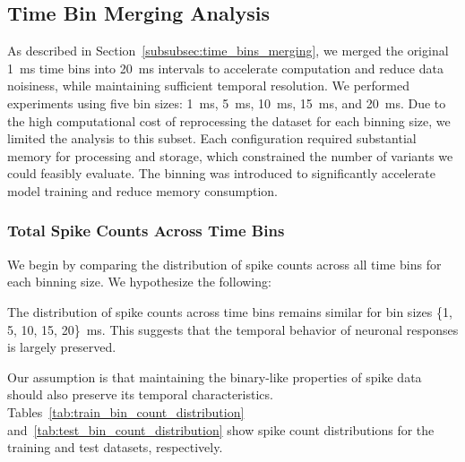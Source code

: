 \subsection{Time Bin Merging Analysis}
\label{subsec:time_bin_merging_analysis}
As described in Section~\ref{subsubsec:time_bins_merging}, we merged the original 1~ms time bins into 20~ms intervals to accelerate computation and reduce data noisiness, while maintaining sufficient temporal resolution. We performed experiments using five bin sizes: 1~ms, 5~ms, 10~ms, 15~ms, and 20~ms. Due to the high computational cost of reprocessing the dataset for each binning size, we limited the analysis to this subset. Each configuration required substantial memory for processing and storage, which constrained the number of variants we could feasibly evaluate. The binning was introduced to significantly accelerate model training and reduce memory consumption.

\subsubsection{Total Spike Counts Across Time Bins}
\label{subsubsec:spike_counts_time_bins}

We begin by comparing the distribution of spike counts across all time bins for each binning size. We hypothesize the following:

\begin{claim}
    The distribution of spike counts across time bins remains similar for bin sizes \{1, 5, 10, 15, 20\}~ms. This suggests that the temporal behavior of neuronal responses is largely preserved.
\end{claim}
\label{claim:tim_bin_counts}

Our assumption is that maintaining the binary-like properties of spike data should also preserve its temporal characteristics. Tables~\ref{tab:train_bin_count_distribution} and~\ref{tab:test_bin_count_distribution} show spike count distributions for the training and test datasets, respectively.

